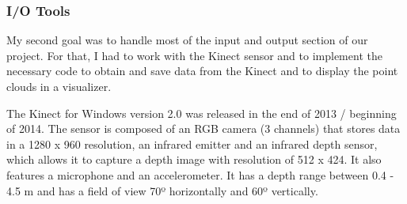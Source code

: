 \documentclass[aps,letterpaper,11pt]{revtex4}
\begin{document}
\subsubsection{I/O Tools}
My second goal was to handle most of the input and output section of our project. For that, I had to work with the Kinect sensor and to implement the necessary code to obtain and save data from the Kinect and to display the point clouds in a visualizer.\par
The Kinect for Windows version 2.0 was released in the end of 2013 / beginning of 2014. The sensor is composed of an RGB camera (3 channels) that stores data in a 1280 x 960 resolution, an infrared emitter and an infrared depth sensor, which allows it to capture a depth image with resolution of 512 x 424. It also features a microphone and an accelerometer. It has a depth range between 0.4 - 4.5 m and has a field of view 70º horizontally and 60º vertically.\par
\end{document}
